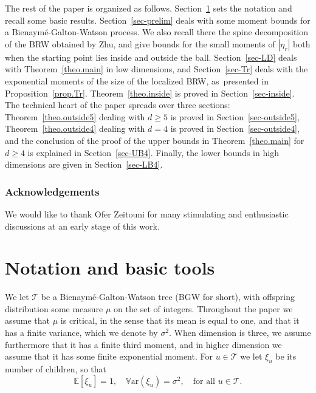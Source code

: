 \documentclass[JEP,XML,SOM,Unicode,NoFloatCountersInSection,published]{cedram}
\theoremstyle{plain}
\theoremstyle{definition}
\newcommand{\1}{{\text{\Large $\mathfrak 1$}}}
\begin{document}
The rest of the paper is organized as follows.
Section~\ref{sec-notation} sets the notation and
recall some basic results.
Section~\ref{sec-prelim} deals with some moment bounds for
a Bienaymé-Galton-Watson process. We also
recall there the spine decomposition of the BRW obtained by Zhu,
and give bounds for the small moments of
$|\eta_r|$ both when the starting point lies inside and outside the ball.
Section~\ref{sec-LD} deals with Theorem~\ref{theo.main} in low dimensions,
and Section~\ref{sec-Tr} deals with the
exponential moments of the size of the localized BRW, as~presented in Proposition~\ref{prop.Tr}. Theorem~\ref{theo.inside} is proved
in Section~\ref{sec-inside}. The technical heart of the paper
spreads over three sections: Theorem~\ref{theo.outside5} dealing with $d\ge 5$ is proved in
Section~\ref{sec-outside5}, Theorem~\ref{theo.outside4} dealing with $d=4$ is proved in Section~\ref{sec-outside4}, and the conclusion of the proof of the upper bounds in Theorem~\ref{theo.main} for $d\ge 4$ is explained in Section~\ref{sec-UB4}. Finally, the lower
bounds in high dimensions are given in Section~\ref{sec-LB4}.

\subsubsection*{Acknowledgements}
We would like to thank Ofer Zeitouni for many stimulating and enthusiastic discussions at an early stage of this work.

\section{Notation and basic tools}\label{sec-notation}

We let $\mathbf{\mathcal T}$ be a Bienaymé-Galton-Watson tree (BGW for short),
with offspring distribution some measure $\mu$ on the set of integers. Throughout the paper we assume that $\mu$ is critical, in the sense that its mean is equal to one, and that it has a finite variance, which we denote by $\sigma^2$.
When dimension is three, we assume furthermore that it has a finite third moment, and in higher dimension we assume that it has some finite exponential moment.
For $u\in \mathbf{\mathcal T}$
we let $\xi_u$ be its number of children, so that
\[
\mathbb E[\xi_u]= 1, \quad \mathbb V\text{ar}(\xi_u)= \sigma^2,
\quad \text{for all }u \in \mathbf{\mathcal T}.
\]
\end{document}
